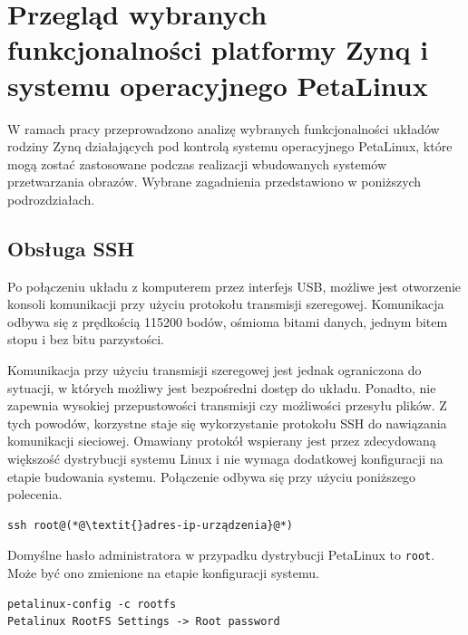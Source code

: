 \chapter{Przegląd wybranych funkcjonalności platformy Zynq i systemu operacyjnego PetaLinux}
\label{cha:functionalities}

W ramach pracy przeprowadzono analizę wybranych funkcjonalności układów rodziny Zynq działających pod kontrolą systemu operacyjnego PetaLinux, które mogą zostać zastosowane podczas realizacji wbudowanych systemów przetwarzania obrazów. 
Wybrane zagadnienia przedstawiono w poniższych podrozdziałach.

\section{Obsługa SSH}
\label{sec:ssh}

Po połączeniu układu z komputerem przez interfejs USB, możliwe jest otworzenie konsoli komunikacji przy użyciu protokołu transmisji szeregowej.
Komunikacja odbywa się z prędkością 115200 bodów, ośmioma bitami danych, jednym bitem stopu i bez bitu parzystości. %

Komunikacja przy użyciu transmisji szeregowej jest jednak ograniczona do sytuacji, w których możliwy jest bezpośredni dostęp do układu. 
Ponadto, nie zapewnia wysokiej przepustowości transmisji czy możliwości przesyłu plików. 
Z tych powodów, korzystne staje się wykorzystanie protokołu SSH do nawiązania komunikacji sieciowej. %
Omawiany protokół wspierany jest przez zdecydowaną większość dystrybucji systemu Linux i nie wymaga dodatkowej konfiguracji na etapie budowania systemu. 
Połączenie odbywa się przy użyciu poniższego polecenia.

\begin{lstlisting}[breaklines=true]
ssh root@(*@\textit{}adres-ip-urządzenia}@*) 
\end{lstlisting} %

Domyślne hasło administratora w przypadku dystrybucji PetaLinux to \texttt{root}. 
Może być ono zmienione na etapie konfiguracji systemu. %


\begin{lstlisting}[breaklines=true]
petalinux-config -c rootfs
Petalinux RootFS Settings -> Root password
\end{lstlisting}

